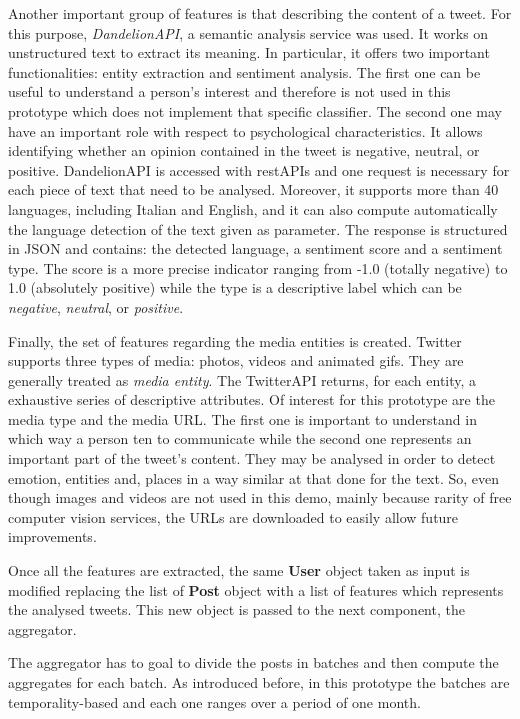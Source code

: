 Another important group of features is that describing the content of a tweet. For this purpose, \textit{DandelionAPI}, a semantic analysis service was used. It works on unstructured text to extract its meaning. 
In particular, it offers two important functionalities: entity extraction and sentiment analysis.
The first one can be useful to understand a person's interest and therefore is not used in this prototype which does not implement that specific classifier.
The second one may have an important role with respect to psychological characteristics.
It allows identifying whether an opinion contained in the tweet is negative, neutral, or positive. 
DandelionAPI is accessed with restAPIs and one request is necessary for each piece of text that need to be analysed. Moreover, it supports more than 40 languages, including Italian and English, and it can also compute automatically the language detection of the text given as parameter.
The response is structured in JSON and contains: the detected language, a sentiment score and a sentiment type.
The score is a more precise indicator ranging from -1.0 (totally negative) to 1.0 (absolutely positive) while the type is a descriptive label which can be \textit{negative}, \textit{neutral}, or \textit{positive}. 

Finally, the set of features regarding the media entities is created. Twitter supports three types of media: photos, videos and animated gifs. They are generally treated as \textit{media entity}.
The TwitterAPI returns, for each entity, a exhaustive series of descriptive attributes. Of interest for this prototype are the media type and the media URL.
The first one is important to understand in which way a person ten to communicate while the second one represents an important part of the tweet's content.
They may be analysed in order to detect emotion, entities and, places in a way similar at that done for the text.
So, even though images and videos are not used in this demo, mainly because rarity of free computer vision services, the URLs are downloaded to easily allow future improvements.

Once all the features are extracted, the same \textbf{User} object taken as input is modified replacing the list of \textbf{Post} object with a list of features which represents the analysed tweets.
This new object is passed to the next component, the aggregator.

The aggregator has to goal to divide the posts in batches and then compute the aggregates for each batch.
As introduced before, in this prototype the batches are temporality-based and each one ranges over a period of one month.
